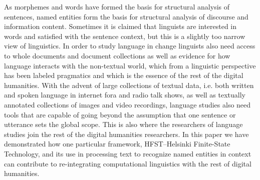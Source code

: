 \documentclass{llncs}
\begin{document}
As morphemes and words have formed the basis for structural analysis
of sentences, named entities form the basis for structural analysis of
discourse and information content. Sometimes it is claimed that
linguists are interested in words and satisfied with the sentence
context, but this is a slightly too narrow view of linguistics. In
order to study language in change linguists also need access to whole
documents and document collections as well as evidence for how
language interacts with the non-textual world, which from a linguistic
perspective has been labeled pragmatics and which is the essence of
the rest of the digital humanities. With the advent of large
collections of textual data, i.e. both written and spoken language in
internet fora and radio talk shows, as well as textually annotated
collections of images and video recordings, language studies also need
tools that are capable of going beyond the assumption that one
sentence or utterance sets the global scope. This is also where the
researchers of language studies join the rest of the digital
humanities researchers. In this paper we have demonstrated how one
particular framework, HFST--Helsinki Finite-State Technology, and its
use in processing text to recognize named entities in context can
contribute to re-integrating computational linguistics with the rest
of digital humanities.




\end{document}
